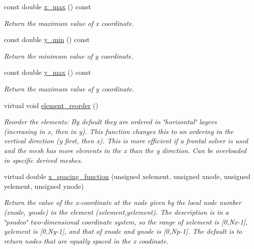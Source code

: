 \begin{DoxyCompactItemize}
const double \hyperlink{classoomph_1_1RectangularQuadMesh_a3449b36a5e4fc4728e517bd38d7b0cc6}{x\+\_\+max} () const
\begin{DoxyCompactList}\small\item\em Return the maximum value of x coordinate. \end{DoxyCompactList}\item 
const double \hyperlink{classoomph_1_1RectangularQuadMesh_a1c493af1dae35746bed7a31e61b46c5b}{y\+\_\+min} () const
\begin{DoxyCompactList}\small\item\em Return the minimum value of y coordinate. \end{DoxyCompactList}\item 
const double \hyperlink{classoomph_1_1RectangularQuadMesh_a7d4a00a545efc20451b00a9b8ad1e17d}{y\+\_\+max} () const
\begin{DoxyCompactList}\small\item\em Return the maximum value of y coordinate. \end{DoxyCompactList}\item 
virtual void \hyperlink{classoomph_1_1RectangularQuadMesh_ae1e1d67808d4efb6e16a3835162a4504}{element\+\_\+reorder} ()
\begin{DoxyCompactList}\small\item\em Reorder the elements\+: By default they are ordered in \char`\"{}horizontal\char`\"{} layers (increasing in x, then in y). This function changes this to an ordering in the vertical direction (y first, then x). This is more efficient if a frontal solver is used and the mesh has more elements in the x than the y direction. Can be overloaded in specific derived meshes. \end{DoxyCompactList}\item 
virtual double \hyperlink{classoomph_1_1RectangularQuadMesh_ad4c2f349cf201cb3107f0a4e5447c16f}{x\+\_\+spacing\+\_\+function} (unsigned xelement, unsigned xnode, unsigned yelement, unsigned ynode)
\begin{DoxyCompactList}\small\item\em Return the value of the x-\/coordinate at the node given by the local node number (xnode, ynode) in the element (xelement,yelement). The description is in a \char`\"{}psudeo\char`\"{} two-\/dimensional coordinate system, so the range of xelement is \mbox{[}0,Nx-\/1\mbox{]}, yelement is \mbox{[}0,Ny-\/1\mbox{]}, and that of xnode and ynode is \mbox{[}0,Np-\/1\mbox{]}. The default is to return nodes that are equally spaced in the x coodinate. \end{DoxyCompactList}\item 

\end{DoxyCompactItemize}
